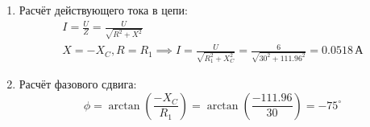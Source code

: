 \begin{enumerate}
	\item Расчёт действующего тока в цепи:
	      \[
		      \begin{gathered}
			      I = \frac{U}{Z} = \frac{U}{\sqrt{R^2 + X^2}} \\
			      X = -X_C, R = R_1 \implies I = \frac{U}{\sqrt{R_1^2+X_C^2}} = \frac{6}{\sqrt{30^2+111.96^2}} = 0.0518 \, \text{А}
		      \end{gathered}
	      \]
	\item Расчёт фазового сдвига:
	      \[
		      \phi = \arctan\left(\frac{-X_C}{R_1}\right) = \arctan\left(\frac{-111.96}{30}\right) = -75^{\circ}
	      \]
\end{enumerate}
